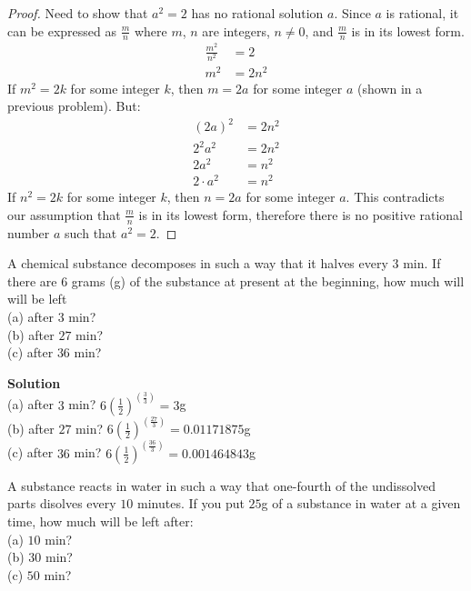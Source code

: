 \begin{proof}
Need to show that $a^2 = 2$ has no rational solution $a$.
Since $a$ is rational, it can be expressed as $\frac{m}{n}$ where $m$, $n$ are integers, 
$n \not = 0$, and $\frac{m}{n}$
is in its lowest form.
\begin{align*}
\frac{m^2}{n^2} &= 2 \\
m^2 &= 2n^2
\end{align*}
If $m^2 = 2k$ for some integer $k$, then $m = 2a$ for some integer $a$ (shown in a previous problem). 
But:
\begin{align*}
{(2a)}^2 &= 2n^2 \\
2^2a^2 &= 2n^2 \\
2 a^2 &= n^2 \\
2 \cdot a^2 &= n^2
\end{align*}
If $n^2 = 2k$ for some integer $k$, then $n = 2a$ for some integer $a$. 
This contradicts our assumption that $\frac{m}{n}$ is in its lowest form, therefore
there is no positive rational number $a$ such that $a^2 = 2$.
\end{proof}


\begin{tcolorbox}[title=Problem 16, breakable]
A chemical substance decomposes in such a way that it halves every $3$ min. If 
there are $6$ grams (g) of the substance at present at the beginning, how much will 
will be left \\
(a) after $3$ min? \\
(b) after $27$ min? \\
(c) after $36$ min?
\end{tcolorbox}

\textbf{Solution} \\
(a) after $3$ min? $6{(\frac{1}{2})}^{(\frac{3}{3})} = 3$g \\
(b) after $27$ min? $6{(\frac{1}{2})}^{(\frac{27}{3})} = 0.01171875$g \\
(c) after $36$ min? $6{(\frac{1}{2})}^{(\frac{36}{3})} = 0.001464843$g

\begin{tcolorbox}[title=Problem 18, breakable]
A substance reacts in water in such a way that one-fourth of the undissolved parts
disolves every $10$ minutes. If you put $25$g of a substance in water at a given
time, how much will be left after: \\
(a) $10$ min? \\
(b) $30$ min? \\
(c) $50$ min?
\end{tcolorbox}

